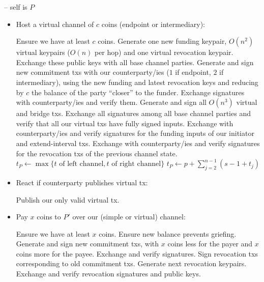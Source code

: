\begin{center}
\begin{processbox}{\pchan -- self is $P$}
\begin{itemize}
      \item Host a virtual channel of $c$ coins (endpoint or intermediary):
      \begin{algorithmic}[0]
        \State Ensure we have at least $c$ coins.
        \State Generate one new funding keypair, $O(n^2)$ virtual keypairs
        ($O(n)$ per hop) and one virtual revocation keypair.
        \State Exchange these public keys with all base channel parties.
        \State Generate and sign new commitment txs with our counterparty/ies
        ($1$ if endpoint, $2$ if intermediary), using the new funding and latest
        revocation keys and reducing by $c$ the balance of the party ``closer''
        to the funder.
        \State Exchange signatures with counterparty/ies and verify them.
        \State Generate and sign all $O(n^3)$ virtual and bridge txs.
        \State Exchange all signatures among all base channel parties and verify
        that all our virtual txs have fully signed inputs.
        \State Exchange with counterparty/ies and verify signatures for the
        funding inputs of our initiator and extend-interval txs.
        \State Exchange with counterparty/ies and verify signatures for the
        revocation txs of the previous channel state.
          \State $t_P \gets \max\{t \text{ of left channel}, t \text{ of right
          channel}\}$
        \Else \: 
          \State $t_P \gets p + \sum_{j = 2}^{n-1}(s - 1 + t_j)$
        \EndIf
      \end{algorithmic}

      \item React if counterparty publishes virtual tx:
      \begin{algorithmic}[0]
        \State Publish our only valid virtual tx. 
      \end{algorithmic}

      \item Pay $x$ coins to $P'$ over our (simple or virtual) channel:
      \begin{algorithmic}[0]
        \State Ensure we have at least $x$ coins.
          \State Ensure new balance prevents griefing.
        \EndIf
        \State Generate and sign new commitment txs, with $x$ coins less for the
        payer and $x$ coins more for the payee.
        \State Exchange and verify signatures.
        \State Sign revocation txs corresponding to old commitment txs.
        \State Generate next revocation keypairs.
        \State Exchange and verify revocation signatures and public keys.
      \end{algorithmic}


\end{itemize}
\end{processbox}
\end{center}
